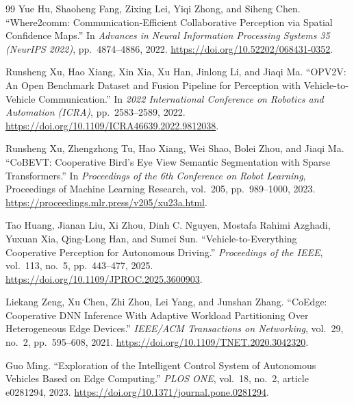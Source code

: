\documentclass[12pt,a4paper,oneside]{report}
\begin{document}
\begin{thebibliography}{99}
  Yue Hu, Shaoheng Fang, Zixing Lei, Yiqi Zhong, and Siheng Chen.
  ``Where2comm: Communication-Efficient Collaborative Perception via
  Spatial Confidence Maps.'' In \textit{Advances in Neural Information
  Processing Systems 35 (NeurIPS 2022)}, pp.\ 4874--4886, 2022.
  \url{https://doi.org/10.52202/068431-0352}.

  Runsheng Xu, Hao Xiang, Xin Xia, Xu Han, Jinlong Li, and Jiaqi Ma.
  ``OPV2V: An Open Benchmark Dataset and Fusion Pipeline for Perception
  with Vehicle-to-Vehicle Communication.'' In \textit{2022 International
  Conference on Robotics and Automation (ICRA)}, pp.\ 2583--2589, 2022.
  \url{https://doi.org/10.1109/ICRA46639.2022.9812038}.

  Runsheng Xu, Zhengzhong Tu, Hao Xiang, Wei Shao, Bolei Zhou, and
  Jiaqi Ma. ``CoBEVT: Cooperative Bird's Eye View Semantic Segmentation
  with Sparse Transformers.'' In \textit{Proceedings of the 6th Conference
  on Robot Learning}, Proceedings of Machine Learning Research, vol.\ 205,
  pp.\ 989--1000, 2023.
  \url{https://proceedings.mlr.press/v205/xu23a.html}.

  Tao Huang, Jianan Liu, Xi Zhou, Dinh C. Nguyen, Mostafa Rahimi Azghadi,
  Yuxuan Xia, Qing-Long Han, and Sumei Sun.
  ``Vehicle-to-Everything Cooperative Perception for Autonomous Driving.''
  \textit{Proceedings of the IEEE}, vol.\ 113, no.\ 5, pp.\ 443--477, 2025.
  \url{https://doi.org/10.1109/JPROC.2025.3600903}.

  Liekang Zeng, Xu Chen, Zhi Zhou, Lei Yang, and Junshan Zhang.
  ``CoEdge: Cooperative DNN Inference With Adaptive Workload Partitioning
  Over Heterogeneous Edge Devices.'' \textit{IEEE/ACM Transactions on
  Networking}, vol.\ 29, no.\ 2, pp.\ 595--608, 2021.
  \url{https://doi.org/10.1109/TNET.2020.3042320}.

  Guo Ming. ``Exploration of the Intelligent Control System of Autonomous
  Vehicles Based on Edge Computing.'' \textit{PLOS ONE}, vol.\ 18, no.\ 2,
  article e0281294, 2023.
  \url{https://doi.org/10.1371/journal.pone.0281294}.
\end{thebibliography}
\end{document}

